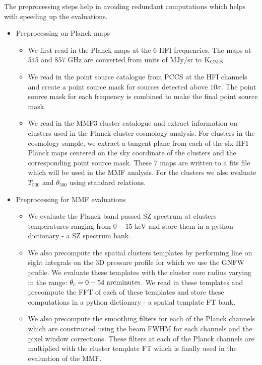 \documentclass[11pt]{article}
\begin{document}
The preprocessing steps help in avoiding redundant computations which helps with speeding up the evaluations.
\begin{itemize}

\item {Preprocessing on Planck maps}
\begin{itemize}
	\item We first read in the Planck maps at the 6 HFI frequencies. The maps at 545 and 857 GHz are converted from units of $\textrm{MJy}/\textrm{sr}$ to $\textrm{K}_{\rm{CMB}}$
	\item We read in the point source catalogue from PCCS at the HFI channels and create a point source mask for sources detected above $10 \sigma$. The point source mask for each frequency is combined to make the final point source mask.
	\item  We read in the MMF3 cluster catalogue and extract information on clusters used in the Planck cluster cosmology analysis. For clusters in the cosmology sample, we extract a tangent plane from each of the six HFI Planck maps centered on the sky coordinate of the clusters and the corresponding point source mask. These 7 maps are written to a fits file which will be used in the MMF analysis. For the clusters we also evaluate $T_{500}$ and $\theta_{500}$ using standard relations.
\end{itemize}

\item{Preprocessing for MMF evaluations}
\begin{itemize}
	\item We evaluate the Planck band passed SZ spectrum at clusters temperatures ranging from $0-15$ \rm{keV} and store them in a python dictionary - a SZ spectrum bank.
	\item We also precompute the spatial clusters templates by performing line on sight integrals on the 3D pressure profile for which we use the GNFW profile. We evaluate these templates with the cluster core radius varying in the range: $\theta_c = 0-54 \rm{ ~arcminutes}$. We read in these templates and precompute the FFT of each of these templates and store these computations in a python dictionary - a spatial template FT bank.
	\item We also precompute the smoothing filters for each of the Planck channels which are constructed using the beam FWHM for each channels and the pixel window corrections. These filters at each of the Planck channels are multiplied with the cluster template FT which is finally used in the evaluation of the MMF.
\end{itemize}


\end{itemize}
\end{document}
